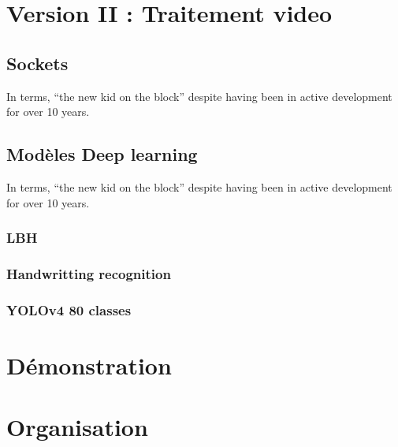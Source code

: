 {%
\pagebreak

\chapter{Version II : Traitement video}\thispagestyle{fancy}


\section{Sockets}
In terms, “the new kid on the block” despite having been in active development for over 10 years.

\section{Modèles Deep learning}
In terms, “the new kid on the block” despite having been in active development for over 10 years.
\subsection{LBH}
\subsection{Handwritting recognition}
\subsection{YOLOv4 80 classes}



\pagebreak
{}
\chapter{Démonstration}\thispagestyle{fancy}


\pagebreak
{}

\chapter{Organisation}\thispagestyle{fancy}
}

